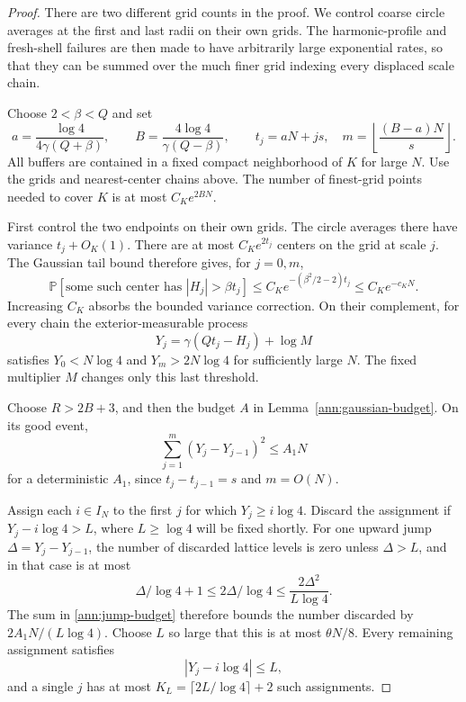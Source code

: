 \documentclass[11pt]{article}
\numberwithin{equation}{section}
\theoremstyle{definition}
\theoremstyle{remark}
\newcommand{\1}{\mathbf 1}
\begin{document}
\begin{proof}
There are two different grid counts in the proof. We control coarse
circle averages at the first and last radii on their own grids.
The harmonic-profile and fresh-shell failures are then made to have
arbitrarily large exponential rates, so that they can be summed over
the much finer grid indexing every displaced scale chain.

Choose \(2<\beta<Q\) and set
\[
 a=\frac{\log4}{4\gamma(Q+\beta)},\qquad
 B=\frac{4\log4}{\gamma(Q-\beta)},\qquad
 t_j=aN+js,\quad
 m=\left\lfloor\frac{(B-a)N}{s}\right\rfloor .
\]
All buffers are contained in a fixed compact neighborhood of \(K\)
for large \(N\).  Use the grids and nearest-center chains above.
The number of finest-grid points needed to cover \(K\) is at most
\(C_Ke^{2BN}\).

First control the two endpoints on their own grids.
The circle averages there have variance \(t_j+O_K(1)\).
There are at most \(C_Ke^{2t_j}\) centers on the grid at scale
\(j\).  The Gaussian tail bound therefore gives, for \(j=0,m\),
\begin{equation}
 \mathbb P[\text{some such center has }|H_j|>\beta t_j]
 \le C_K e^{-(\beta^2/2-2)t_j}
 \le C_K e^{-c_KN}.
 \label{ann:endpoint-tail}
\end{equation}
Increasing \(C_K\) absorbs the bounded variance correction.
On their complement, for every chain the exterior-measurable
process
\[
 Y_j=\gamma(Qt_j-H_j)+\log M
\]
satisfies \(Y_0<N\log4\) and \(Y_m>2N\log4\) for sufficiently
large \(N\).  The fixed multiplier \(M\) changes only this last
threshold.

Choose \(R>2B+3\), and then the budget \(A\) in
Lemma~\ref{ann:gaussian-budget}.  On its good event,
\begin{equation}
 \sum_{j=1}^m(Y_j-Y_{j-1})^2\le A_1N
 \label{ann:jump-budget}
\end{equation}
for a deterministic \(A_1\), since \(t_j-t_{j-1}=s\)
and \(m=O(N)\).

Assign each \(i\in I_N\) to the first \(j\) for which
\(Y_j\ge i\log4\).  Discard the assignment if
\(Y_j-i\log4>L\), where \(L\ge\log4\) will be fixed shortly.
For one upward jump \(\Delta=Y_j-Y_{j-1}\), the number of
discarded lattice levels is zero unless \(\Delta>L\), and in
that case is at most
\[
 \Delta/\log4+1\le 2\Delta/\log4
                 \le\frac{2\Delta^2}{L\log4}.
\]
The sum in \eqref{ann:jump-budget} therefore bounds the number
discarded by \(2A_1N/(L\log4)\).  Choose \(L\) so large
that this is at most \(\theta N/8\).
Every remaining assignment satisfies
\begin{equation}
 |Y_j-i\log4|\le L,
 \label{ann:alignment}
\end{equation}
and a single \(j\) has at most
\(K_L=\lceil2L/\log4\rceil+2\) such assignments.


\end{proof}
\end{document}
